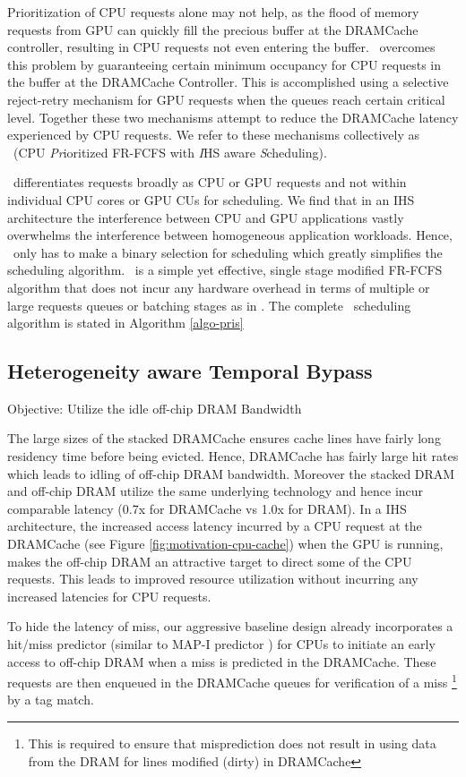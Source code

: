 \par Prioritization of CPU requests alone may not help, as the flood of memory requests from  GPU can quickly fill the precious buffer at the DRAMCache controller, resulting in CPU requests not even entering the buffer. \cachename\ overcomes this problem by guaranteeing certain minimum occupancy for CPU requests in the buffer at the DRAMCache Controller. This is accomplished using a selective reject-retry mechanism for GPU requests when the queues reach certain critical level.  Together these two mechanisms attempt to reduce the DRAMCache latency experienced by CPU requests.  We refer to these  mechanisms collectively as \prioname\ (CPU \emph{Pr}ioritized FR-FCFS with \emph{I}HS aware \emph{S}cheduling). 
\par \prioname\ differentiates requests broadly as CPU or GPU requests and not within individual CPU cores or GPU CUs for scheduling. We find that in an IHS architecture the interference between CPU and GPU applications vastly overwhelms the interference between homogeneous application workloads. Hence, \prioname\ only has to make a binary selection for scheduling which greatly simplifies the scheduling algorithm. \prioname\ is a simple yet effective, single stage modified FR-FCFS algorithm that does not incur any hardware overhead in terms of multiple or large requests queues or batching stages as in \cite{sms}.
The complete \prioname\ scheduling algorithm is stated in Algorithm \ref{algo-pris}



\subsection{Heterogeneity aware Temporal Bypass} \label{mechanism-bye}
Objective: Utilize the idle off-chip DRAM Bandwidth
\par The large sizes of the stacked DRAMCache ensures cache lines have fairly long residency time before being evicted. Hence, DRAMCache has fairly large hit rates which leads to idling of off-chip DRAM bandwidth. Moreover the stacked DRAM and off-chip DRAM utilize the same underlying technology and hence incur comparable latency (0.7x for DRAMCache vs 1.0x for DRAM). 
In a IHS architecture, the increased access latency incurred by a CPU request at the DRAMCache (see Figure \ref{fig:motivation-cpu-cache}) when the GPU is running, makes the off-chip DRAM an attractive target to direct some of the CPU requests. This leads to improved resource utilization without incurring any increased latencies for CPU requests. 
\par To hide the latency of miss, our aggressive baseline design already incorporates a hit/miss predictor (similar to MAP-I predictor \cite{alloy}) for CPUs to initiate an early access to off-chip DRAM when a miss is predicted in the DRAMCache. These requests are then enqueued in the DRAMCache queues for verification of a miss 
\footnote{This is required to ensure that misprediction does not result in using data from the DRAM for lines modified (dirty) in DRAMCache}
by a tag match. 


